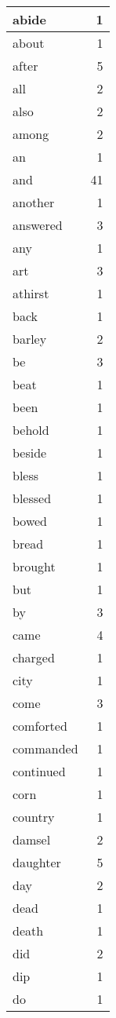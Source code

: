 \begin{center}
\begin{longtable}{l|r}
abide & 1 \\ \hline
about & 1 \\ \hline
after & 5 \\ \hline
all & 2 \\ \hline
also & 2 \\ \hline
among & 2 \\ \hline
an & 1 \\ \hline
and & 41 \\ \hline
another & 1 \\ \hline
answered & 3 \\ \hline
any & 1 \\ \hline
art & 3 \\ \hline
athirst & 1 \\ \hline
back & 1 \\ \hline
barley & 2 \\ \hline
be & 3 \\ \hline
beat & 1 \\ \hline
been & 1 \\ \hline
behold & 1 \\ \hline
beside & 1 \\ \hline
bless & 1 \\ \hline
blessed & 1 \\ \hline
bowed & 1 \\ \hline
bread & 1 \\ \hline
brought & 1 \\ \hline
but & 1 \\ \hline
by & 3 \\ \hline
came & 4 \\ \hline
charged & 1 \\ \hline
city & 1 \\ \hline
come & 3 \\ \hline
comforted & 1 \\ \hline
commanded & 1 \\ \hline
continued & 1 \\ \hline
corn & 1 \\ \hline
country & 1 \\ \hline
damsel & 2 \\ \hline
daughter & 5 \\ \hline
day & 2 \\ \hline
dead & 1 \\ \hline
death & 1 \\ \hline
did & 2 \\ \hline
dip & 1 \\ \hline
do & 1 \\ \hline

\end{longtable}
\end{center}
